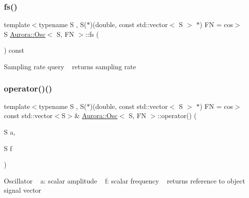 \subsubsection{\texorpdfstring{fs()}{fs()}}
{\footnotesize\ttfamily template$<$typename S , S($\ast$)(double, const std\+::vector$<$ S $>$ $\ast$) FN = cos$>$ \\
S \hyperlink{class_aurora_1_1_osc}{Aurora\+::\+Osc}$<$ S, FN $>$\+::fs (\begin{DoxyParamCaption}{ }\end{DoxyParamCaption}) const\hspace{0.3cm}{\ttfamily [inline]}}

Sampling rate query ~\newline
returns sampling rate \mbox{\label{class_aurora_1_1_osc_ae468eb608399c463e0b862ea08a1882c}} 
\subsubsection{\texorpdfstring{operator()()}{operator()()}\hspace{0.1cm}{\footnotesize\ttfamily [1/6]}}
{\footnotesize\ttfamily template$<$typename S , S($\ast$)(double, const std\+::vector$<$ S $>$ $\ast$) FN = cos$>$ \\
const std\+::vector$<$S$>$\& \hyperlink{class_aurora_1_1_osc}{Aurora\+::\+Osc}$<$ S, FN $>$\+::operator() (\begin{DoxyParamCaption}\item[{S}]{a,  }\item[{S}]{f }\end{DoxyParamCaption})\hspace{0.3cm}{\ttfamily [inline]}}

Oscillator ~\newline
a\+: scalar amplitude ~\newline
f\+: scalar frequency ~\newline
returns reference to object signal vector \mbox{\label{class_aurora_1_1_osc_abeee979869e6605f9ace573a499ec152}} 

